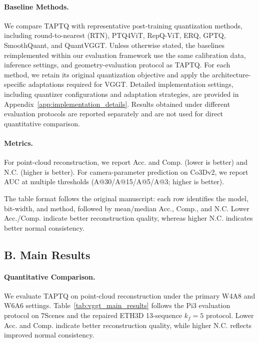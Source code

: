 \documentclass[journal]{Tail_Aware_Post_Training_Quantization_for_3D_Geometry_Models_TMM/IEEEtran}
\begin{document}
\paragraph{Baseline Methods.}
We compare TAPTQ with representative post-training quantization methods, including round-to-nearest (RTN), PTQ4ViT, RepQ-ViT, ERQ, GPTQ, SmoothQuant, and QuantVGGT. Unless otherwise stated, the baselines reimplemented within our evaluation framework use the same calibration data, inference settings, and geometry-evaluation protocol as TAPTQ. For each method, we retain its original quantization objective and apply the architecture-specific adaptations required for VGGT. Detailed implementation settings, including quantizer configurations and adaptation strategies, are provided in Appendix~\ref{app:implementation_details}. Results obtained under different evaluation protocols are reported separately and are not used for direct quantitative comparison.

\paragraph{Metrics.}
For point-cloud reconstruction, we report Acc. and Comp. (lower is better) and N.C. (higher is better). For camera-parameter prediction on Co3Dv2, we report AUC at multiple thresholds (A@30/A@15/A@5/A@3; higher is better).

The table format follows the original manuscript: each row identifies the model, bit-width, and method, followed by mean/median Acc., Comp., and N.C. Lower Acc./Comp. indicate better reconstruction quality, whereas higher N.C. indicates better normal consistency.

\subsection{B. Main Results}

\paragraph{Quantitative Comparison.}
We evaluate TAPTQ on point-cloud reconstruction under the primary W4A8 and W6A6 settings. Table~\ref{tab:vggt_main_results} follows the Pi3 evaluation protocol on 7Scenes and the repaired ETH3D 13-sequence $k_f=5$ protocol. Lower Acc. and Comp. indicate better reconstruction quality, while higher N.C. reflects improved normal consistency.
\end{document}
